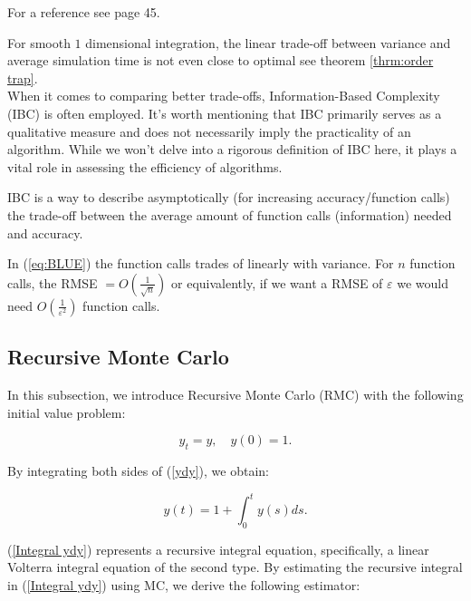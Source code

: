 \documentclass[a4paper,12pt]{article}
\begin{document}
\begin{related}
    For a reference see \cite{veach_robust_1997} page 45.
\end{related}

For smooth $1$ dimensional integration, the linear trade-off between
variance and average simulation time is not even close to optimal see
theorem \ref{thrm:order trap}. \\
When it comes to comparing better trade-offs,
Information-Based Complexity (IBC) is often employed.
It's worth mentioning that IBC primarily serves as a
qualitative measure and does not necessarily imply the
practicality of an algorithm. While we won't delve into a
rigorous definition of IBC here, it plays a vital role in
assessing the efficiency of algorithms.

\begin{definition}
    IBC is a way to describe asymptotically (for increasing accuracy/function calls)
    the trade-off between the average amount of function calls (information)
    needed and accuracy.
\end{definition}

\begin{example}
    In (\ref{eq:BLUE}) the function calls trades of
    linearly with variance. For $n$ function calls,
    the RMSE $= O\left(\frac{1}{\sqrt{n}}\right)$ or equivalently, if we want a
    RMSE of $\varepsilon$ we would need $O\left(\frac{1}{\varepsilon^{2}}\right)$
    function calls.
\end{example}


\subsection{Recursive Monte Carlo}
In this subsection, we introduce Recursive Monte Carlo (RMC)
with the following  initial value problem:


\begin{equation} \label{ydy}
    y_t = y, \quad y(0) = 1.
\end{equation}


By integrating both sides of (\ref{ydy}), we obtain:

\begin{equation} \label{Integral ydy}
    y(t) = 1 + \int_{0}^{t} y(s) ds.
\end{equation}

(\ref{Integral ydy}) represents a recursive integral equation,
specifically, a linear Volterra integral equation of the second type.
By estimating the recursive integral in (\ref{Integral ydy})
using MC, we derive the following estimator:
\end{document}

